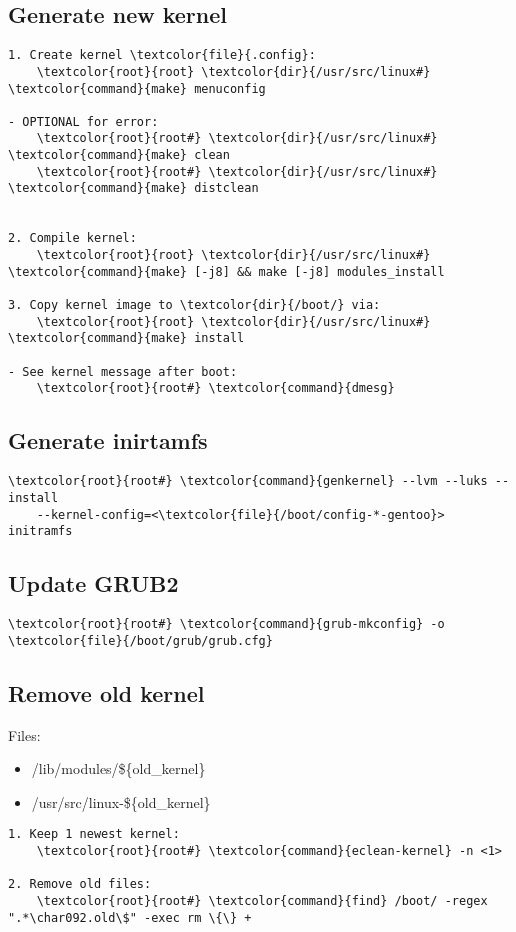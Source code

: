 \documentclass[10pt, a4paper, onecolumn, openany]{book}         %
\begin{document}
\subsection{Generate new kernel}
\begin{Verbatim}[commandchars=\\\{\}]
1. Create kernel \textcolor{file}{.config}:
    \textcolor{root}{root} \textcolor{dir}{/usr/src/linux#}  \textcolor{command}{make} menuconfig

- OPTIONAL for error:
    \textcolor{root}{root#} \textcolor{dir}{/usr/src/linux#} \textcolor{command}{make} clean
    \textcolor{root}{root#} \textcolor{dir}{/usr/src/linux#} \textcolor{command}{make} distclean


2. Compile kernel:
    \textcolor{root}{root} \textcolor{dir}{/usr/src/linux#} \textcolor{command}{make} [-j8] && make [-j8] modules_install
    
3. Copy kernel image to \textcolor{dir}{/boot/} via:
    \textcolor{root}{root} \textcolor{dir}{/usr/src/linux#} \textcolor{command}{make} install
    
- See kernel message after boot:
    \textcolor{root}{root#} \textcolor{command}{dmesg}
\end{Verbatim}
\subsection{Generate inirtamfs}
\begin{Verbatim}[commandchars=\\\{\}]
    \textcolor{root}{root#} \textcolor{command}{genkernel} --lvm --luks --install
    --kernel-config=<\textcolor{file}{/boot/config-*-gentoo}> initramfs
\end{Verbatim}

\subsection{Update GRUB2}
\label{update-grub}
\begin{Verbatim}[commandchars=\\\{\}]
    \textcolor{root}{root#} \textcolor{command}{grub-mkconfig} -o \textcolor{file}{/boot/grub/grub.cfg}
\end{Verbatim}

\subsection{Remove old kernel}
Files:\newline
\begin{itemize}
    \item \textcolor{file}{/lib/modules/\$\{old\_kernel\}}
    \item \textcolor{file}{/usr/src/linux-\$\{old\_kernel\}}
\end{itemize}
\begin{Verbatim}[commandchars=\\\{\}]
1. Keep 1 newest kernel:
    \textcolor{root}{root#} \textcolor{command}{eclean-kernel} -n <1>
    
2. Remove old files:
    \textcolor{root}{root#} \textcolor{command}{find} /boot/ -regex ".*\char092.old\$" -exec rm \{\} +
\end{Verbatim}
\end{document}
